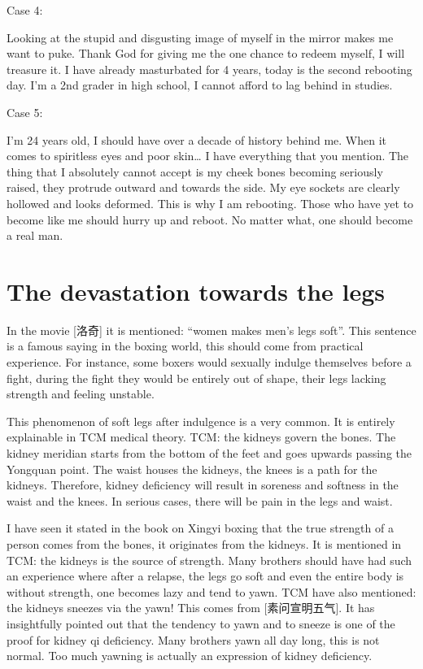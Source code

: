 \documentclass[
]{book}
\begin{document}
Case 4:

Looking at the stupid and disgusting image of myself in the mirror makes me want to puke. Thank God for giving me the one chance to redeem myself, I will treasure it. I have already masturbated for 4 years, today is the second rebooting day. I'm a 2nd grader in high school, I cannot afford to lag behind in studies.

Case 5:

I'm 24 years old, I should have over a decade of history behind me. When it comes to spiritless eyes and poor skin\ldots{} I have everything that you mention. The thing that I absolutely cannot accept is my cheek bones becoming seriously raised, they protrude outward and towards the side. My eye sockets are clearly hollowed and looks deformed. This is why I am rebooting. Those who have yet to become like me should hurry up and reboot. No matter what, one should become a real man.

\hypertarget{the-devastation-towards-the-legs}{%
\section{The devastation towards the legs}\label{the-devastation-towards-the-legs}}

In the movie {[}洛奇{]} it is mentioned: ``women makes men's legs soft''. This sentence is a famous saying in the boxing world, this should come from practical experience. For instance, some boxers would sexually indulge themselves before a fight, during the fight they would be entirely out of shape, their legs lacking strength and feeling unstable.

This phenomenon of soft legs after indulgence is a very common. It is entirely explainable in TCM medical theory. TCM: the kidneys govern the bones. The kidney meridian starts from the bottom of the feet and goes upwards passing the Yongquan point. The waist houses the kidneys, the knees is a path for the kidneys. Therefore, kidney deficiency will result in soreness and softness in the waist and the knees. In serious cases, there will be pain in the legs and waist.

I have seen it stated in the book on Xingyi boxing that the true strength of a person comes from the bones, it originates from the kidneys. It is mentioned in TCM: the kidneys is the source of strength. Many brothers should have had such an experience where after a relapse, the legs go soft and even the entire body is without strength, one becomes lazy and tend to yawn. TCM have also mentioned: the kidneys sneezes via the yawn! This comes from {[}素问宣明五气{]}. It has insightfully pointed out that the tendency to yawn and to sneeze is one of the proof for kidney qi deficiency. Many brothers yawn all day long, this is not normal. Too much yawning is actually an expression of kidney deficiency.
\end{document}

